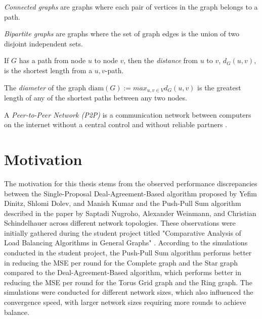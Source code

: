 \begin{definition}
    \textit{Connected graphs} are graphs where each pair of vertices in the graph belongs to a path.
\end{definition}

\begin{definition}
    \textit{Bipartite graphs} are graphs where the set of graph edges is the union of two disjoint independent sets.
\end{definition}

\begin{definition}
    If $G$ has a path from node $u$ to node $v$, then the \textit{distance} from $u$ to $v$, $d_G(u,v)$, is the shortest length from a $u,v$-path.
    
    The \textit{diameter} of the graph $\text{diam} (G) := max_{u,v\in V}d_G(u,v)$ is the greatest length of any of the shortest paths between any two nodes.
\end{definition}

\begin{definition}
    A \textit{Peer-to-Peer Network (P2P)} is a communication network between computers on the internet without a central control and without reliable partners \cite{Peer2PeerSchindelhaauer2023}.
\end{definition}

\section{Motivation}\label{sec:motivation}
The motivation for this thesis stems from the observed performance discrepancies between the Single-Proposal Deal-Agreement-Based algorithm proposed by Yefim Dinitz, Shlomi Dolev, and Manish Kumar \cite{Dinitz2023DAB} and the Push-Pull Sum algorithm described in the paper by Saptadi Nugroho, Alexander Weinmann, and Christian Schindelhauer \cite{nugroho2023PushPullSumDataAg} across different network topologies. These observations were initially gathered during the student project titled "Comparative Analysis of Load Balancing Algorithms in General Graphs" \cite{Bayazitoglu}. According to the simulations conducted in the student project, the Push-Pull Sum algorithm performs better in reducing the MSE per round for the Complete graph and the Star graph compared to the Deal-Agreement-Based algorithm, which performs better in reducing the MSE per round for the Torus Grid graph and the Ring graph. The simulations were conducted for different network sizes, which also influenced the convergence speed, with larger network sizes requiring more rounds to achieve balance.

